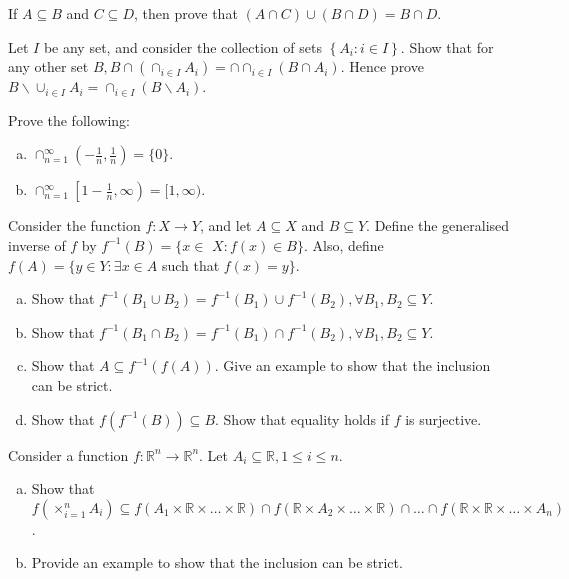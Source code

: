 \begin{problem}
	If $A \subseteq B$ and $C \subseteq D$, then prove that $(A \cap C) \cup(B \cap D)=B \cap D$.
\end{problem}

\begin{problem}
	Let $I$ be any set, and consider the collection of sets $\left\{A_{i}: i \in I\right\}$. Show that for any other set $B, B \cap\left(\cap_{i \in I} A_{i}\right)=\cap \cap_{i \in I}\left(B \cap A_{i}\right)$. Hence prove $B \backslash \cup_{i \in I} A_{i}=\cap_{i \in I}\left(B \backslash A_{i}\right)$.
\end{problem}

\begin{problem}
	Prove the following:
	\begin{enumerate}[a)]
	\item $\cap_{n=1}^{\infty}\left(-\frac{1}{n}, \frac{1}{n}\right)=\{0\}$.
	\item $\cap_{n=1}^{\infty}\left[1-\frac{1}{n}, \infty\right)=[1, \infty)$.
	\end{enumerate}
\end{problem}

\begin{problem}
	Consider the function $f: X \rightarrow Y$, and let $A \subseteq X$ and $B \subseteq Y$. Define the generalised inverse of $f$ by $f^{-1}(B)=\{x \in$ $X: f(x) \in B\}$. Also, define $f(A)=\{y \in Y: \exists x \in A$ such that $f(x)=y\}$.
	\begin{enumerate}[a)]
	\item Show that $f^{-1}\left(B_{1} \cup B_{2}\right)=f^{-1}\left(B_{1}\right) \cup f^{-1}\left(B_{2}\right), \forall B_{1}, B_{2} \subseteq Y$.
	\item Show that $f^{-1}\left(B_{1} \cap B_{2}\right)=f^{-1}\left(B_{1}\right) \cap f^{-1}\left(B_{2}\right), \forall B_{1}, B_{2} \subseteq Y$.
	\item Show that $A \subseteq f^{-1}(f(A))$. Give an example to show that the inclusion can be strict.
	\item Show that $f\left(f^{-1}(B)\right) \subseteq B$. Show that equality holds if $f$ is surjective.
	\end{enumerate}
\end{problem}

\begin{problem}
	Consider a function $f: \mathbb{R}^{n} \rightarrow \mathbb{R}^{n}$. Let $A_{i} \subseteq \mathbb{R}, 1 \leq i \leq n$.
	\begin{enumerate}[a)]
	\item Show that $f\left(\times_{i=1}^{n} A_{i}\right) \subseteq f\left(A_{1} \times \mathbb{R} \times \ldots \times \mathbb{R}\right) \cap f\left(\mathbb{R} \times A_{2} \times \ldots \times \mathbb{R}\right) \cap \ldots \cap f\left(\mathbb{R} \times \mathbb{R} \times \ldots \times A_{n}\right)$.
	\item Provide an example to show that the inclusion can be strict.
	\end{enumerate}
\end{problem}

